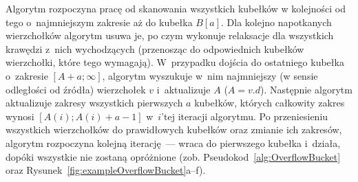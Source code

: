 Algorytm rozpoczyna pracę od skanowania wszystkich kubełków w kolejności od tego o~najmniejszym zakresie aż do kubełka $B \left[ a\right]$.
Dla kolejno napotkanych wierzchołków algorytm usuwa je, po czym wykonuje relaksacje dla wszystkich krawędzi z~nich wychodzących (przenosząc do odpowiednich kubełków wierzchołki, które tego wymagają).
W~przypadku dojścia do ostatniego kubełka o~zakresie $\left [ A + a; \infty \right]$, algorytm wyszukuje w~nim najmniejszy (w sensie odległości od źródła) wierzchołek $v$ i~aktualizuje $A$ ($A = v.d$).
Następnie algorytm aktualizuje zakresy wszystkich pierwszych $a$ kubełków, których całkowity zakres wynosi $\left [ A \left( i \right) ; A \left( i \right) + a- 1 \right]$ w~$i$'tej iteracji algorytmu.
Po przeniesieniu wszystkich wierzchołków do prawidłowych kubełków oraz zmianie ich zakresów, algorytm rozpoczyna kolejną iterację~--- wraca do pierwszego kubełka i~działa, dopóki wszystkie nie zostaną opróżnione (zob. Pseudokod~\ref{alg:OverflowBucket} oraz Rysunek~\ref{fig:exampleOverflowBucket}a--f).

